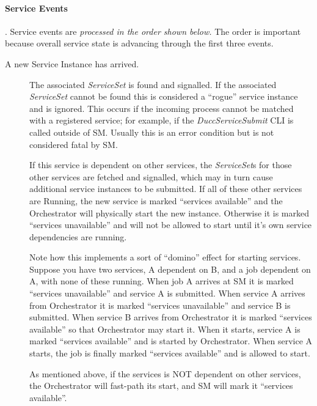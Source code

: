     \paragraph{Service Events}. Service events are {\em processed in the order shown
    below.} The order is important because overall service state is advancing through the
    first three events.
    
    \begin{description}
      \item[A new Service Instance has arrived.]  The associated {\em ServiceSet}
        is found and signalled.  If the associated {\em ServiceSet} cannot be found this
        is considered a ``rogue'' service instance and is ignored.  This occurs if
        the incoming process cannot be matched with a registered service; for example, if
        the {\em DuccServiceSubmit} CLI is called outside of SM.  Usually this is an
        error condition but is not considered fatal by SM.

        If this service is dependent on other services, the {\em ServiceSet}s for those
        other services are fetched and signalled, which may in turn cause additional
        service instances to be submitted.  If all of these other services are Running,
        the new service is marked ``services available'' and the Orchestrator will 
        physically start the new instance.  Otherwise it is marked ``services unavailable''
        and will not be allowed to start until it's own service dependencies are running.

        Note how this implements a sort of ``domino'' effect for starting services.  Suppose
        you have two services, A dependent on B, and a job dependent on A,
        with none of these running.  When job A arrives at SM it is marked ``services unavailable'' and
        service A is submitted.  When service A arrives from Orchestrator it is marked ``services unavailable'' and
        service B is submitted.  When service B arrives from Orchestrator it is marked ``services available'' so 
        that Orchestrator may start it.  When it starts, service A is marked ``services available'' and is
        started by Orchestrator.  When service A starts, the job is finally marked ``services available'' and
        is allowed to start.

        As mentioned above, if the services is NOT dependent on other services, the Orchestrator
        will fast-path its start, and SM will mark it ``services available''.
     

\end{description}
